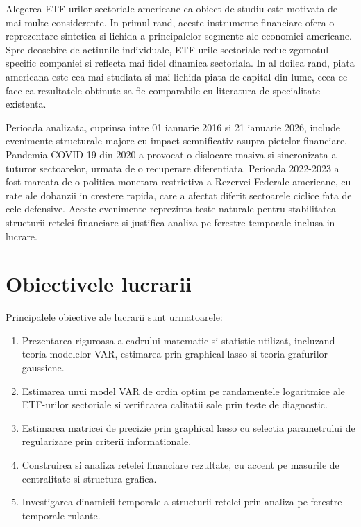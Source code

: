 Alegerea ETF-urilor sectoriale americane ca obiect de studiu este motivata de
mai multe considerente. In primul rand, aceste instrumente financiare ofera
o reprezentare sintetica si lichida a principalelor segmente ale economiei
americane. Spre deosebire de actiunile individuale, ETF-urile sectoriale reduc
zgomotul specific companiei si reflecta mai fidel dinamica sectoriala. In al
doilea rand, piata americana este cea mai studiata si mai lichida piata de capital
din lume, ceea ce face ca rezultatele obtinute sa fie comparabile cu literatura
de specialitate existenta.

Perioada analizata, cuprinsa intre 01 ianuarie 2016 si 21 ianuarie 2026, include
evenimente structurale majore cu impact semnificativ asupra pietelor financiare.
Pandemia COVID-19 din 2020 a provocat o dislocare masiva si sincronizata a
tuturor sectoarelor, urmata de o recuperare diferentiata. Perioada 2022-2023
a fost marcata de o politica monetara restrictiva a Rezervei Federale americane,
cu rate ale dobanzii in crestere rapida, care a afectat diferit sectoarele
ciclice fata de cele defensive. Aceste evenimente reprezinta teste naturale
pentru stabilitatea structurii retelei financiare si justifica analiza pe
ferestre temporale inclusa in lucrare.

\section{Obiectivele lucrarii}

Principalele obiective ale lucrarii sunt urmatoarele:

\begin{enumerate}
    \item Prezentarea riguroasa a cadrului matematic si statistic utilizat,
    incluzand teoria modelelor VAR, estimarea prin graphical lasso si teoria
    grafurilor gaussiene.

    \item Estimarea unui model VAR de ordin optim pe randamentele logaritmice
    ale ETF-urilor sectoriale si verificarea calitatii sale prin teste de
    diagnostic.

    \item Estimarea matricei de precizie prin graphical lasso cu selectia
    parametrului de regularizare prin criterii informationale.

    \item Construirea si analiza retelei financiare rezultate, cu accent pe
    masurile de centralitate si structura grafica.

    \item Investigarea dinamicii temporale a structurii retelei prin analiza
    pe ferestre temporale rulante.
\end{enumerate}

